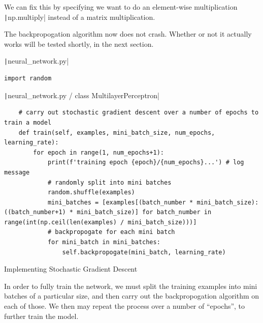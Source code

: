 \documentclass[12pt]{report}
\newcommand{\pil}[1]{\protect\texttt|#1|}
\begin{document}
We can fix this by specifying we want to do an element-wise multiplication \pil{np.multiply} instead of a matrix multiplication.

\begin{center}
\end{center}

The backpropogation algorithm now does not crash. Whether or not it actually works will be tested shortly, in the next section.

\begin{listing}[H]
\pil{neural_network.py}
\begin{verbatim}
import random
\end{verbatim}
\pil{neural_network.py / class MultilayerPerceptron}
\begin{verbatim}
    # carry out stochastic gradient descent over a number of epochs to train a model
    def train(self, examples, mini_batch_size, num_epochs, learning_rate):
        for epoch in range(1, num_epochs+1):
            print(f'training epoch {epoch}/{num_epochs}...') # log message
            # randomly split into mini batches
            random.shuffle(examples)
            mini_batches = [examples[(batch_number * mini_batch_size):((batch_number+1) * mini_batch_size)] for batch_number in range(int(np.ceil(len(examples) / mini_batch_size)))]
            # backpropogate for each mini batch
            for mini_batch in mini_batches:
                self.backpropogate(mini_batch, learning_rate)
\end{verbatim}
\caption{Implementing Stochastic Gradient Descent}\label{cs:stochasticGradientDescent}
\end{listing}

In order to fully train the network, we must split the training examples into mini batches of a particular size, and then carry out the backpropogation algorithm on each of those. We then may repeat the process over a number of ``epochs'', to further train the model.
\end{document}
